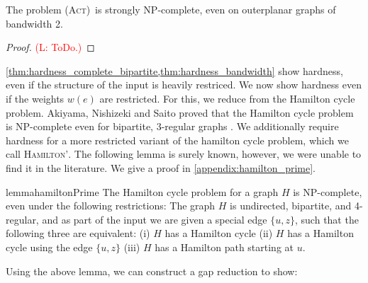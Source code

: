 \documentclass[runningheads]{llncs}
\numberwithin{equation}{section}
\newcommand{\set}[1]{\{ #1 \}}
\newcommand{\comment}[1]{\textcolor{red}{(L: #1)}}
\newcommand{\act}{\textsc{(Act)}}
\begin{document}
\begin{theorem}
\label{thm:hardness_bandwidth}
The problem \act\ is strongly NP-complete, even on outerplanar graphs of bandwidth 2.
\end{theorem}
\begin{proof}
\comment{ToDo.}
\end{proof}

\cref{thm:hardness_complete_bipartite,thm:hardness_bandwidth} show hardness, even if the structure of the input is heavily restriced. We now show hardness even if the weights $w(e)$ are restricted. For this, we reduce from the Hamilton cycle problem. Akiyama, Nishizeki and Saito proved that the Hamilton cycle problem is NP-complete even for bipartite, 3-regular graphs \cite{hamilton3regularBip}. We additionally require hardness for a more restricted variant of the hamilton cycle problem, which we call \textsc{Hamilton'}. The following lemma is surely known, however, we were unable to find it in the literature. We give a proof in \cref{appendix:hamilton_prime}.

\begin{restatable}{lemma}{hamiltonPrime}
\label{hamilton_cycle_lemma}
The Hamilton cycle problem for a graph $H$ is NP-complete, even under the following restrictions: The graph $H$ is undirected, bipartite, and 4-regular, and as part of the input we are given a special edge $\set{u, z}$, such that the following three are equivalent: (i) $H$ has a Hamilton cycle (ii) $H$ has a Hamilton cycle using the edge $\set{u, z}$ (iii) $H$ has a Hamilton path starting at $u$.
\end{restatable} 

Using the above lemma, we can construct a gap reduction to show:
\end{document}
